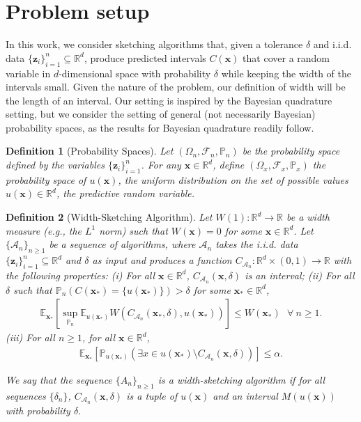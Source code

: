 \documentclass{article} %
\newtheorem{definition}{Definition}[section]
\theoremstyle{remark}
\theoremstyle{definition}      %
\begin{document}
\section{Problem setup}

In this work, we consider sketching algorithms that, given a tolerance $\delta$ and i.i.d. data $\{ \bm z_i \}_{i=1}^{n} \subseteq \mathbb{R}^d$, produce predicted intervals $C(\bm{x})$ that cover a random variable in $d$-dimensional space with probability $\delta$ while keeping the width of the intervals small. Given the nature of the problem, our definition of width will be the length of an interval. Our setting is inspired by the Bayesian quadrature setting, but we consider the setting of general (not necessarily Bayesian) probability spaces, as the results for Bayesian quadrature readily follow. 
\begin{definition}[Probability Spaces]\label{def:prob_space}
  Let $(\Omega_n,\mathcal{F}_n,\mathbb{P}_n)$ be the probability space defined by the variables $\{ \bm z_i \}_{i=1}^{n}$. For any $\bm{x} \in \mathbb{R}^d$, define $(\Omega_x, \mathcal{F}_x,\mathbb{P}_x)$  the probability space of $u(\bm{x})$, the uniform distribution on the set of possible values $u(\bm{x}) \in \mathbb{R}^d$, the predictive random variable. 
\end{definition}
\begin{definition}[Width-Sketching Algorithm]\label{def:width_sketch_alg}
  Let $W(1) : \mathbb{R}^d \rightarrow \mathbb{R}$ be a width measure (e.g., the $L^1$ norm) such that $W(\bm{x}) = 0$ for some  $\bm{x} \in \mathbb{R}^d$. Let $\{\mathcal{A}_n\}_{n \geq 1}$ be a sequence of algorithms, where $\mathcal{A}_n$ takes the i.i.d. data $\{ \bm z_i \}_{i=1}^{n} \subseteq \mathbb{R}^d$ and $\delta$ as input and produces a function $C_{\mathcal{A}_n}: \mathbb{R}^d \times (0,1) \rightarrow \mathbb{R}$ with the following properties: (i) For all $\bm{x} \in \mathbb{R}^d$, $C_{\mathcal{A}_n}(\bm{x},\delta)$ is an interval; (ii) For all $\delta$ such that $\mathbb{P}_n(C(\bm{x_*}) = \{u(\bm{x_*})\}) > \delta$  for some $\bm{x_*} \in \mathbb{R}^d$, 
    \begin{align} \label{meas_width}
      \mathbb{E}_{\bm{x}_*}\left[ \sup_{\mathbb{P}_n} \mathbb{E}_{u(\bm{x_*})}W(C_{\mathcal{A}_n}(\bm{x_*},\delta),u(\bm{x_*})) \right]  \leq W(\bm{x_*}) ~~~ \forall ~ n \geq 1.  
  \end{align}
    (iii) For all $n \geq 1$, for all $\bm{x} \in \mathbb{R}^d$,
      \begin{align}\label{meas_depth}
          \mathbb{E}_{\bm{x}_*}[\mathbb{P}_{u(\bm{x_*})}(\exists x \in u(\bm{x_*}) \setminus C_{\mathcal{A}_n}(\bm{x},\delta))]  \leq \alpha.
      \end{align}
  
  We say that the sequence $\{A_n\}_{n \geq 1}$ is a \emph{width-sketching algorithm} if for all sequences $\{\delta_n\}$, $C_{\mathcal{A}_n}(\bm{x},\delta)$ is a tuple of $u(\bm{x})$ and an interval $M(u(\bm{x}))$ with probability $\delta$.
\end{definition} 
\end{document}
